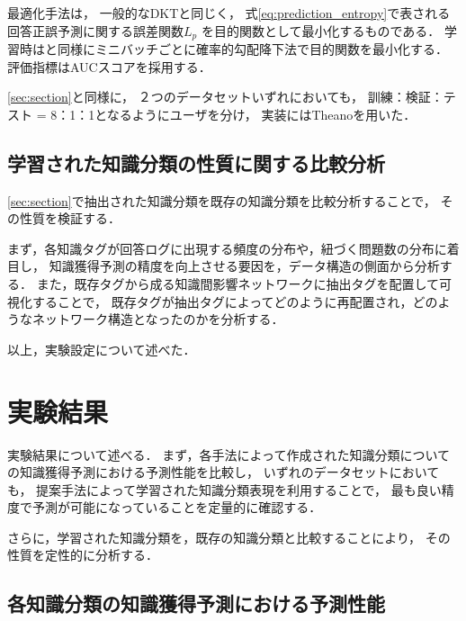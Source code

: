 最適化手法は，
一般的なDKTと同じく，
式\ref{eq:prediction_entropy}で表される回答正誤予測に関する誤差関数$L_p$
を目的関数として最小化するものである．
学習時は\cite{piech2015deep}と同様にミニバッチごとに確率的勾配降下法で目的関数を最小化する．
評価指標はAUCスコアを採用する．

\ref{sec:section}と同様に，
２つのデータセットいずれにおいても，
訓練：検証：テスト = 8：1：1となるようにユーザを分け，
実装にはTheanoを用いた．


\subsection{学習された知識分類の性質に関する比較分析}

\ref{sec:section}で抽出された知識分類を既存の知識分類を比較分析することで，
その性質を検証する．

まず，各知識タグが回答ログに出現する頻度の分布や，紐づく問題数の分布に着目し，
知識獲得予測の精度を向上させる要因を，データ構造の側面から分析する．
また，既存タグから成る知識間影響ネットワークに抽出タグを配置して可視化することで，
既存タグが抽出タグによってどのように再配置され，どのようなネットワーク構造となったのかを分析する．




以上，実験設定について述べた．



\section{実験結果}
実験結果について述べる．
まず，各手法によって作成された知識分類についての知識獲得予測における予測性能を比較し，
いずれのデータセットにおいても，
提案手法によって学習された知識分類表現を利用することで，
最も良い精度で予測が可能になっていることを定量的に確認する．

さらに，学習された知識分類を，既存の知識分類と比較することにより，
その性質を定性的に分析する．



\subsection{各知識分類の知識獲得予測における予測性能}

